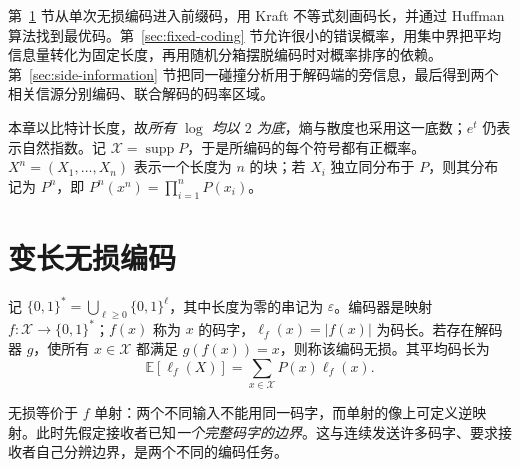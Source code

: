 \documentclass[lang=cn,a4paper,fontset=none,zihao=false,10pt,openany,twoside]{beautybook}
\numberwithin{algorithm}{chapter}
\begin{document}
第~\ref{sec:variable-coding} 节从单次无损编码进入前缀码，用 Kraft 不等式刻画码长，并通过 Huffman 算法找到最优码。第~\ref{sec:fixed-coding} 节允许很小的错误概率，用集中界把平均信息量转化为固定长度，再用随机分箱摆脱编码时对概率排序的依赖。第~\ref{sec:side-information} 节把同一碰撞分析用于解码端的旁信息，最后得到两个相关信源分别编码、联合解码的码率区域。
\begin{center}
\end{center}
本章以比特计长度，故\emph{所有 $\log$ 均以 $2$ 为底}，熵与散度也采用这一底数；$e^t$ 仍表示自然指数。记 $\mathcal X=\operatorname{supp}P$，于是所编码的每个符号都有正概率。$X^n=(X_1,\ldots,X_n)$ 表示一个长度为 $n$ 的块；若 $X_i$ 独立同分布于 $P$，则其分布记为 $P^n$，即 $P^n(x^n)=\prod_{i=1}^nP(x_i)$。

\section{变长无损编码}\label{sec:variable-coding}
\begin{definition}[编码、解码与码长]\label{def:lossless-code}
记 $\{0,1\}^*=\bigcup_{\ell\ge0}\{0,1\}^{\ell}$，其中长度为零的串记为 $\varepsilon$。编码器是映射 $f:\mathcal X\to\{0,1\}^*$；$f(x)$ 称为 $x$ 的码字，$\ell_f(x)=|f(x)|$ 为码长。若存在解码器 $g$，使所有 $x\in\mathcal X$ 都满足 $g(f(x))=x$，则称该编码无损。其平均码长为
\[
 \mathbb E[\ell_f(X)]=\sum_{x\in\mathcal X}P(x)\ell_f(x).
\]
\end{definition}
无损等价于 $f$ 单射：两个不同输入不能用同一码字，而单射的像上可定义逆映射。此时先假定接收者已知\emph{一个完整码字的边界}。这与连续发送许多码字、要求接收者自己分辨边界，是两个不同的编码任务。
\begin{center}
\end{center}
\end{document}
